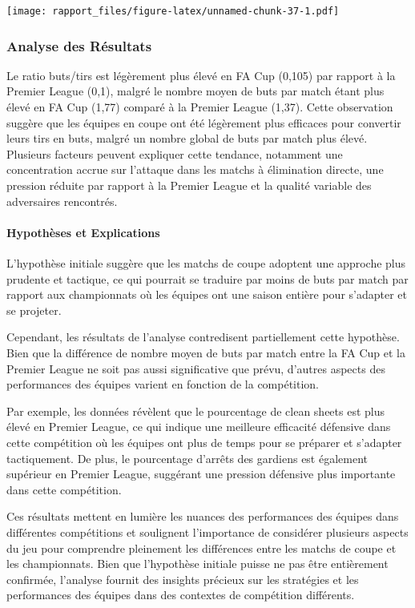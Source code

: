 \documentclass[
]{article}
\begin{document}
\texttt{[image: rapport\_files/figure-latex/unnamed-chunk-37-1.pdf]}

\subsubsection{Analyse des Résultats}\label{analyse-des-ruxe9sultats-5}

Le ratio buts/tirs est légèrement plus élevé en FA Cup (0,105) par
rapport à la Premier League (0,1), malgré le nombre moyen de buts par
match étant plus élevé en FA Cup (1,77) comparé à la Premier League
(1,37). Cette observation suggère que les équipes en coupe ont été
légèrement plus efficaces pour convertir leurs tirs en buts, malgré un
nombre global de buts par match plus élevé. Plusieurs facteurs peuvent
expliquer cette tendance, notamment une concentration accrue sur
l'attaque dans les matchs à élimination directe, une pression réduite
par rapport à la Premier League et la qualité variable des adversaires
rencontrés.

\paragraph{Hypothèses et
Explications}\label{hypothuxe8ses-et-explications-4}

L'hypothèse initiale suggère que les matchs de coupe adoptent une
approche plus prudente et tactique, ce qui pourrait se traduire par
moins de buts par match par rapport aux championnats où les équipes ont
une saison entière pour s'adapter et se projeter.

Cependant, les résultats de l'analyse contredisent partiellement cette
hypothèse. Bien que la différence de nombre moyen de buts par match
entre la FA Cup et la Premier League ne soit pas aussi significative que
prévu, d'autres aspects des performances des équipes varient en fonction
de la compétition.

Par exemple, les données révèlent que le pourcentage de clean sheets est
plus élevé en Premier League, ce qui indique une meilleure efficacité
défensive dans cette compétition où les équipes ont plus de temps pour
se préparer et s'adapter tactiquement. De plus, le pourcentage d'arrêts
des gardiens est également supérieur en Premier League, suggérant une
pression défensive plus importante dans cette compétition.

Ces résultats mettent en lumière les nuances des performances des
équipes dans différentes compétitions et soulignent l'importance de
considérer plusieurs aspects du jeu pour comprendre pleinement les
différences entre les matchs de coupe et les championnats. Bien que
l'hypothèse initiale puisse ne pas être entièrement confirmée, l'analyse
fournit des insights précieux sur les stratégies et les performances des
équipes dans des contextes de compétition différents.
\end{document}
